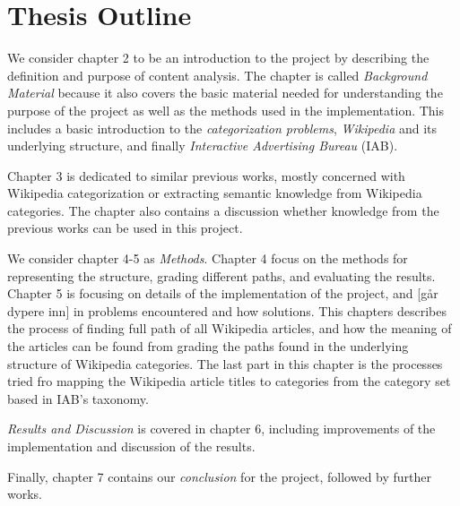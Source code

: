 \section{Thesis Outline}
We consider chapter 2 to be an introduction to the project by describing the definition and purpose of content analysis. The chapter is called \emph{Background Material} because it also covers the basic material needed for understanding the purpose of the project as well as the methods used in the implementation. This includes a basic introduction to the \emph{categorization problems}, \emph{Wikipedia} and its underlying structure, and finally \emph{Interactive Advertising Bureau} (IAB). 

Chapter 3 is dedicated to similar previous works, mostly concerned with Wikipedia categorization or extracting semantic knowledge from Wikipedia categories. The chapter also contains a discussion whether knowledge from the previous works can be used in this project. 

We consider chapter 4-5 as \emph{Methods}. Chapter 4 focus on the methods for representing the structure, grading different paths, and evaluating the results. Chapter 5 is focusing on details of the implementation of the project, and [går dypere inn] in problems encountered and how solutions. This chapters describes the process of finding full path of all Wikipedia articles, and how the meaning of the articles can be found from grading the paths found in the underlying structure of Wikipedia categories. The last part in this chapter is the processes tried fro mapping the Wikipedia article titles to categories from the category set based in IAB's taxonomy. 

\emph{Results and Discussion} is covered in chapter 6, including improvements of the implementation and discussion of the results.

Finally, chapter 7 contains our \emph{conclusion} for the project, followed by further works. 

\begin{comment}
covers the background material needed for understanding the purpose of the project and the methods used in the implementation. The background material covers the purpose and definition of content analysis, categorization, Interactive Advertising Bureau, and finally Wikipedia and its structure. 

In chapt

After , chapter 3 

After describing the challenges, the next natural step is to look at previous work and research which is given in chapter 3, along with discussing if these findings can be used in our project. 

Chapter 4 is focusing on the implementation of the project and explains the approach for solving the problem. The chapter describes the process of finding full path of all Wikpedia articles from Wikipedia categories, how the paths are graded to find the most relevant paths for each article and the mapping process to the desirable output category set. 

Chapter 5 shows the results and improvements made to the implementation, which led to  

\end{comment}